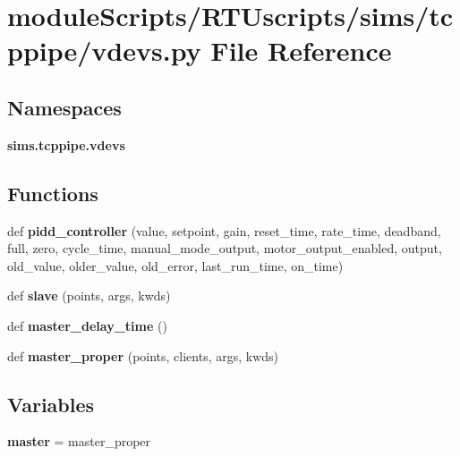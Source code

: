 \section{module\+Scripts/\+R\+T\+Uscripts/sims/tcppipe/vdevs.py File Reference}
\label{tcppipe_2vdevs_8py}
\subsection*{Namespaces}
\begin{DoxyCompactItemize}
\item 
 {\bf sims.\+tcppipe.\+vdevs}
\end{DoxyCompactItemize}
\subsection*{Functions}
\begin{DoxyCompactItemize}
\item 
def {\bf pidd\+\_\+controller} (value, setpoint, gain, reset\+\_\+time, rate\+\_\+time, deadband, full, zero, cycle\+\_\+time, manual\+\_\+mode\+\_\+output, motor\+\_\+output\+\_\+enabled, output, old\+\_\+value, older\+\_\+value, old\+\_\+error, last\+\_\+run\+\_\+time, on\+\_\+time)
\item 
def {\bf slave} (points, args, kwds)
\item 
def {\bf master\+\_\+delay\+\_\+time} ()
\item 
def {\bf master\+\_\+proper} (points, clients, args, kwds)
\end{DoxyCompactItemize}
\subsection*{Variables}
\begin{DoxyCompactItemize}
\item 
{\bf master} = master\+\_\+proper
\end{DoxyCompactItemize}
